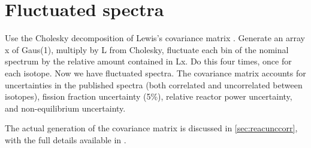 \documentclass[../thesis.tex]{subfiles}
\begin{document}
\section{Fluctuated spectra}
\label{sec:reactoyFluct}

Use the Cholesky decomposition of Lewis's covariance matrix \cite{Lewis}. Generate an array x of Gaus(1), multiply by L from Cholesky, fluctuate each bin of the nominal spectrum by the relative amount contained in Lx. Do this four times, once for each isotope. Now we have fluctuated spectra. The covariance matrix accounts for uncertainties in the published spectra (both correlated and uncorrelated between isotopes), fission fraction uncertainty (5\%), relative reactor power uncertainty, and non-equilibrium uncertainty.

The actual generation of the covariance matrix is discussed in \autoref{sec:reacunccorr}, with the full details available in \cite{Lewis}.
\end{document}
